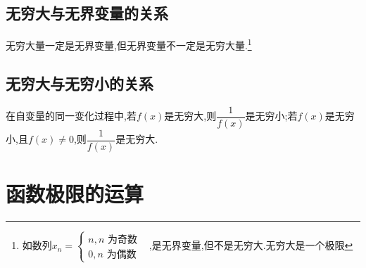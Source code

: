 \documentclass[12pt, a4paper, oneside, UTF8]{ctexbook}
\begin{document}
\begin{sloppypar}
    \subsection{无穷大与无界变量的关系}
    无穷大量一定是无界变量,但无界变量不一定是无穷大量.\footnote{如数列$x_n=\begin{cases}n,n\text{ 为奇数}\\0,n\text{ 为偶数}&\end{cases}$,是无界变量,但不是无穷大.无穷大是一个极限}
    \subsection{无穷大与无穷小的关系}
    在自变量的同一变化过程中,若$f(x)$是无穷大,则$\dfrac{1}{f(x)}$是无穷小;若$f(x)$是无穷小,且$f(x)\neq 0$,则$\dfrac{1}{f(x)}$是无穷大.
    \section{函数极限的运算}

\end{sloppypar}
\end{document}
